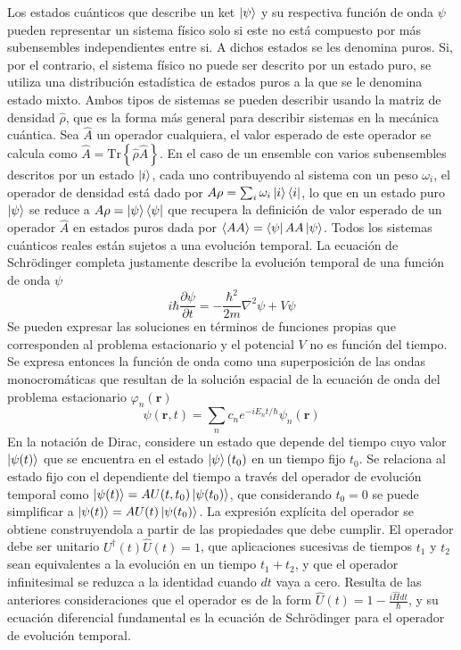 Los estados cuánticos que describe un ket $\ket{\psi}$ y su respectiva función de onda $\psi$ pueden representar un sistema físico solo si este no está compuesto por más subensembles independientes entre si. A dichos estados se les denomina puros. Si, por el contrario, el sistema físico no puede ser descrito por un estado puro, se utiliza una distribución estadística de estados puros a la que se le denomina estado mixto. Ambos tipos de sistemas se pueden describir usando la matriz de densidad $\hat{\rho}$, que es la forma más general para describir sistemas en la mecánica cuántica\cite{Pena}. Sea $\hat{A}$ un operador cualquiera, el valor esperado de este operador se calcula como $\hat{A} = \text{Tr}\left\{ \hat{\rho} \hat{A} \right\}$. En el caso de un ensemble con varios subensembles descritos por un estado $\ket{i}$, cada uno contribuyendo al sistema con un peso $\omega_i$, el operador de densidad está dado por $A{\rho} = \sum_i \omega_i \ket{i} \bra{i}$, lo que en un estado puro $\ket{\psi}$ se reduce a $A{\rho} = \ket{\psi}\bra{\psi}$ que recupera la definición de valor esperado de un operador $\hat{A}$ en estados puros dada por $\langle A{A}\rangle = \bra{\psi}A{A}\ket{\psi}$.
Todos los sistemas cuánticos reales están sujetos a una evolución temporal. La ecuación de Schrödinger completa justamente describe la evolución temporal de una función de onda $\psi$
\begin{equation}
  i\hbar\frac{\partial \psi}{\partial t} = -\frac{\hbar^2}{2m}\nabla^2 \psi + V\psi
\end{equation}
Se pueden expresar las soluciones en términos de funciones propias que corresponden al problema estacionario y el potencial $V$ no es función del tiempo. Se expresa entonces la función de onda como una superposición de las ondas monocromáticas que resultan de la solución espacial de la ecuación de onda del problema estacionario $\varphi_n(\mathbf{r})$
\begin{equation}
  \psi(\mathbf{r}, t) = \sum_n c_n e^{-iE_n t/\hbar}\psi_n(\mathbf{r})
\end{equation}
En la notación de Dirac, considere un estado que depende del tiempo cuyo valor $\ket{\psi(t)}$ que se encuentra en el estado $\ket{\psi}(t_0)$ en un tiempo fijo $t_0$. Se relaciona al estado fijo con el dependiente del tiempo a través del operador de evolución temporal como $\ket{\psi(t)} = A{U}(t, t_0) \ket{\psi(t_0)}$, que considerando $t_0=0$ se puede simplificar a $\ket{\psi(t)} = A{U}(t) \ket{\psi(t_0)}$. La expresión explícita del operador se obtiene construyendola a partir de las propiedades que debe cumplir. El operador debe ser unitario $U^\dagger(t)\hat{U}(t) = 1$, que aplicaciones sucesivas de tiempos $t_1$ y $t_2$ sean equivalentes a la evolución en un tiempo $t_1+t_2$, y que el operador infinitesimal se reduzca a la identidad cuando $dt$ vaya a cero. Resulta de las anteriores consideraciones que el operador es de la form $\hat{U}(t) = 1-\frac{i\hat{H}dt}{\hbar}$, y su ecuación diferencial fundamental es la ecuación de Schrödinger para el operador de evolución temporal.
